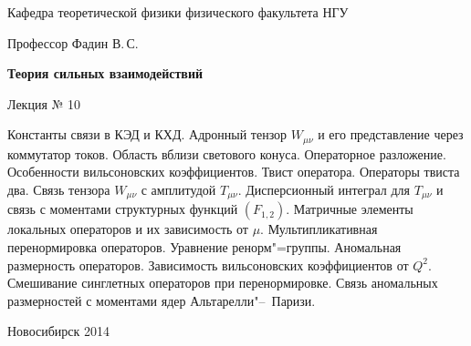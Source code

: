 \documentclass[12pt,pagesize,paper=landscape,paper=192mm:108mm]{scrbook}
\begin{document}
\begin{titlepage}
\begin{center}
    Кафедра теоретической физики физического факультета НГУ

    \Large
    Профессор Фадин В.\,С.

    \huge
    \textbf{Теория сильных взаимодействий}
    
    \Large
    Лекция № 10
    \vfill
    
    \normalsize
    \begin{minipage}{0.95\linewidth}
      \small Константы связи в КЭД и КХД. Адронный тензор $W_{\mu\nu}$ и его
      представление через коммутатор токов. Область вблизи светового
      конуса. Операторное разложение. Особенности вильсоновских
      коэффициентов. Твист оператора. Операторы твиста два. Связь
      тензора $W_{\mu\nu}$ с амплитудой $T_{\mu\nu}$. Дисперсионный
      интеграл для $T_{\mu\nu}$ и связь с моментами структурных
      функций $(F_{1,2})$. Матричные элементы локальных операторов и
      их зависимость от $\mu$. Мультипликативная перенормировка
      операторов. Уравнение ренорм"=группы. Аномальная размерность
      операторов. Зависимость вильсоновских коэффициентов от
      $Q^2$. Смешивание синглетных операторов при
      перенормировке. Связь аномальных размерностей с моментами ядер
      Альтарелли"--~Паризи.
    \end{minipage}
    \vfill
    
    \normalsize \ccbysa\hspace{0.5em}   Новосибирск 2014   
  \end{center}
\end{titlepage}
\end{document}

